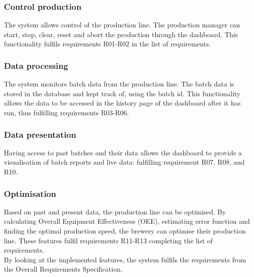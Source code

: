 \subsubsection{Control production} 
The system allows control of the production line. The production manager can
start, stop, clear, reset and abort the production through the dashboard. This
functionality fulfils requirements R01-R02 in the list of requirements.

\subsubsection{Data processing}
The system monitors batch data from the production line. The batch data is
stored in the database and kept track of, using the batch id. This functionality
allows the data to be accessed in the history page of the dashboard after it has
run, thus fulfilling requirements R03-R06.

\subsubsection{Data presentation}
Having access to past batches and their data allows the dashboard to provide a
visualisation of batch reports and live data: fulfilling requirement R07, R08,
and R10.

\subsubsection{Optimisation}
Based on past and present data, the production line can be optimised. By
calculating Overall Equipment Effectiveness (OEE), estimating error function and
finding the optimal production speed, the brewery can optimise their production
line. These features fulfil requirements R11-R13 completing the list of
requirements. \\

By looking at the implemented features, the system fulfils the requirements from
the Overall Requirements Specification.
